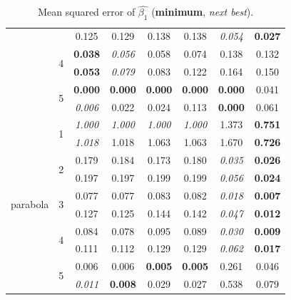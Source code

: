 \documentclass[authoryear, review, 11pt]{elsarticle}
\begin{document}
\begin{table}
\begin{center}
\begin{tabular}{cccccccc}
   &  & 0.125 & 0.129 & 0.138 & 0.138 & \emph{0.054} & \textbf{0.027} \\ 
   \cline{3-8}
   & \multirow{2}{*}{4} & \textbf{0.038} & \emph{0.056} & 0.058 & 0.074 & 0.138 & 0.132 \\ 
   &  & \textbf{0.053} & \emph{0.079} & 0.083 & 0.122 & 0.164 & 0.150 \\ 
   \cline{3-8}
   & \multirow{2}{*}{5} & \textbf{0.000} & \textbf{0.000} & \textbf{0.000} & \textbf{0.000} & \textbf{0.000} & 0.041 \\ 
   &  & \emph{0.006} & 0.022 & 0.024 & 0.113 & \textbf{0.000} & 0.061 \\ 
   \hline
  \multirow{10}{*}{parabola} & \multirow{2}{*}{1} & \emph{1.000} & \emph{1.000} & \emph{1.000} & \emph{1.000} & 1.373 & \textbf{0.751} \\ 
   &  & \emph{1.018} & 1.018 & 1.063 & 1.063 & 1.670 & \textbf{0.726} \\ 
   \cline{3-8}
   & \multirow{2}{*}{2} & 0.179 & 0.184 & 0.173 & 0.180 & \emph{0.035} & \textbf{0.026} \\ 
   &  & 0.197 & 0.197 & 0.199 & 0.199 & \emph{0.056} & \textbf{0.024} \\ 
   \cline{3-8}
   & \multirow{2}{*}{3} & 0.077 & 0.077 & 0.083 & 0.082 & \emph{0.018} & \textbf{0.007} \\ 
   &  & 0.127 & 0.125 & 0.144 & 0.142 & \emph{0.047} & \textbf{0.012} \\ 
   \cline{3-8}
   & \multirow{2}{*}{4} & 0.084 & 0.078 & 0.095 & 0.089 & \emph{0.030} & \textbf{0.009} \\ 
   &  & 0.111 & 0.112 & 0.129 & 0.129 & \emph{0.062} & \textbf{0.017} \\ 
   \cline{3-8}
   & \multirow{2}{*}{5} & 0.006 & 0.006 & \textbf{0.005} & \textbf{0.005} & 0.261 & 0.046 \\ 
   &  & \emph{0.011} & \textbf{0.008} & 0.029 & 0.027 & 0.538 & 0.079 \\ 
  \end{tabular}
\caption{Mean squared error of $\hat{\beta_1}$ (\textbf{minimum}, \emph{next best}).\label{table:X1-mse}}
\end{center}
\end{table}
		
\end{document}
